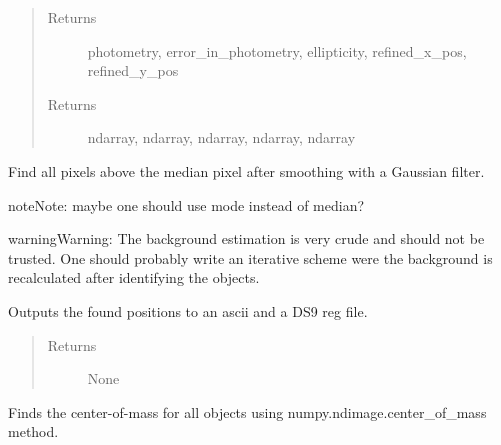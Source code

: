 \documentclass[a4paper,11pt,english]{sphinxmanual}
\begin{document}
\begin{fulllineitems}
\begin{fulllineitems}
\begin{quote}
\begin{description}
\item[{Returns}] \leavevmode
photometry, error\_in\_photometry, ellipticity, refined\_x\_pos, refined\_y\_pos

\item[{Returns}] \leavevmode
ndarray, ndarray, ndarray, ndarray, ndarray

\end{description}\end{quote}

\end{fulllineitems}


\begin{fulllineitems}
Find all pixels above the median pixel after smoothing with a Gaussian filter.

\begin{notice}{note}{Note:}
maybe one should use mode instead of median?
\end{notice}

\begin{notice}{warning}{Warning:}
The background estimation is very crude and should not be trusted. One should probably write
an iterative scheme were the background is recalculated after identifying the objects.
\end{notice}

\end{fulllineitems}


\begin{fulllineitems}
Outputs the found positions to an ascii and a DS9 reg file.
\begin{quote}\begin{description}
\item[{Returns}] \leavevmode
None

\end{description}\end{quote}

\end{fulllineitems}


\begin{fulllineitems}
Finds the center-of-mass for all objects using numpy.ndimage.center\_of\_mass method.


\end{fulllineitems}
\end{fulllineitems}
\end{document}
